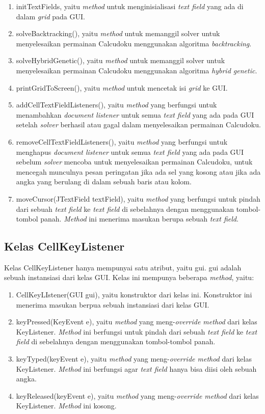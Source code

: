 \begin{enumerate}
\item initTextFields, yaitu \textit{method} untuk menginisialisasi \textit{text field} yang ada di dalam \textit{grid} pada GUI.
\item solveBacktracking(), yaitu \textit{method} untuk memanggil solver untuk menyelesaikan permainan Calcudoku menggunakan algoritma \textit{backtracking}. 
\item solveHybridGenetic(), yaitu \textit{method} untuk memanggil solver untuk menyelesaikan permainan Calcudoku menggunakan algoritma \textit{hybrid genetic}.
\item printGridToScreen(), yaitu \textit{method} untuk mencetak isi \textit{grid} ke GUI.
\item addCellTextFieldListeners(), yaitu \textit{method} yang berfungsi untuk menambahkan \textit{document listener} untuk semua \textit{text field} yang ada pada GUI setelah \textit{solver} berhasil atau gagal dalam menyelesaikan permainan Calcudoku.
\item removeCellTextFieldListeners(), yaitu \textit{method} yang berfungsi untuk menghapus \textit{document listener} untuk semua \textit{text field} yang ada pada GUI sebelum \textit{solver} mencoba untuk menyelesaikan permainan Calcudoku, untuk mencegah munculnya pesan peringatan jika ada sel yang kosong atau jika ada angka yang berulang di dalam sebuah baris atau kolom.
\item moveCursor(JTextField textField), yaitu \textit{method} yang berfungsi untuk pindah dari sebuah \textit{text field} ke \textit{text field} di sebelahnya dengan menggunakan tombol-tombol panah. \textit{Method} ini menerima masukan berupa sebuah \textit{text field}.
\end{enumerate}

\subsection{Kelas CellKeyListener}
\label{sec:kelascellkeylistener}

Kelas CellKeyListener hanya mempunyai satu atribut, yaitu gui. gui adalah sebuah instansiasi dari kelas GUI. Kelas ini mempunya beberapa \textit{method}, yaitu:

\begin{enumerate}
\item CellKeyLIstener(GUI gui), yaitu konstruktor dari kelas ini. Konstruktor ini menerima masukan berpua sebuah instansiasi dari kelas GUI.
\item keyPressed(KeyEvent e), yaitu \textit{method} yang meng-\textit{override method} dari kelas KeyListener. \textit{Method} ini berfungsi untuk pindah dari sebuah \textit{text field} ke \textit{text field} di sebelahnya dengan menggunakan tombol-tombol panah.
\item keyTyped(keyEvent e), yaitu \textit{method} yang meng-\textit{override method} dari kelas KeyListener. \textit{Method} ini berfungsi agar \textit{text field} hanya bisa diisi oleh sebuah angka.
\item keyReleased(keyEvent e), yaitu \textit{method} yang meng-\textit{override method} dari kelas KeyListener. \textit{Method} ini kosong.
\end{enumerate}

